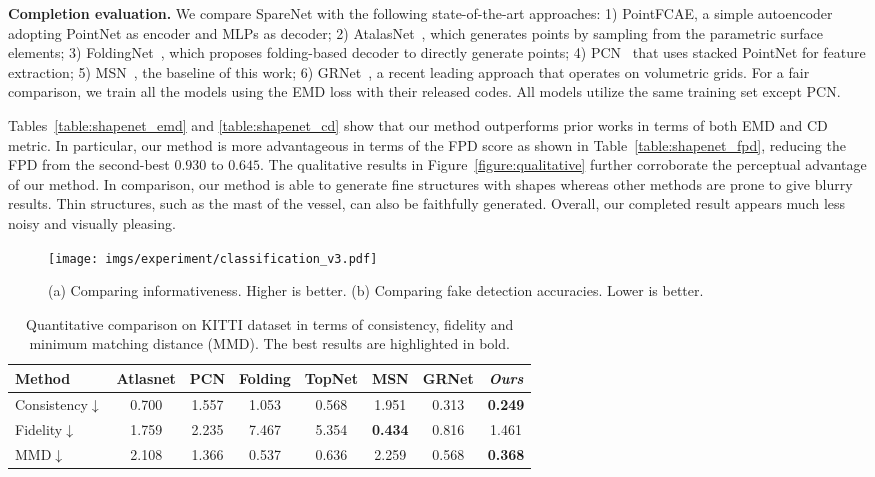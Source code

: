 \documentclass[final]{cvpr}
\begin{document}
\noindent\textbf{Completion evaluation.}
We compare SpareNet with the following state-of-the-art approaches: 1) PointFCAE, a simple autoencoder adopting PointNet as encoder and MLPs as decoder; 2) AtalasNet~\cite{atlasnet2018}, which generates points by sampling from the parametric surface elements; 3) FoldingNet~\cite{foldingnet_2018_CVPR}, which proposes folding-based decoder to directly generate points;  4) PCN~\cite{Yuan-2018-pcn} that uses stacked PointNet for feature extraction; 5) MSN~\cite{liu2019morphing}, the baseline of this work; 6) GRNet~\cite{xie2020grnet}, a recent leading approach that operates on volumetric grids. For a fair comparison, we train all the models using the EMD loss with their released codes. All models utilize the same training set except PCN. 

Tables~\ref{table:shapenet_emd} and \ref{table:shapenet_cd} show that our method outperforms prior works in terms of both EMD and CD metric. In particular, our method is more advantageous in terms of the FPD score as shown in Table~\ref{table:shapenet_fpd}, reducing the FPD from the second-best $0.930$ to $0.645$. The qualitative results in Figure~\ref{figure:qualitative} further corroborate the perceptual advantage of our method. In comparison, our method is able to generate fine structures with shapes whereas other methods are prone to give blurry results. Thin structures, such as the mast of the vessel, can also be faithfully generated. Overall, our completed result appears much less noisy and visually pleasing.


\begin{figure}[t]
\centering
 \texttt{[image: imgs/experiment/classification\_v3.pdf]}
 \footnotesize
\caption{(a) Comparing informativeness. Higher is better. (b) Comparing fake detection accuracies. Lower is better. }
\label{fig:pointnet_classification}
\vspace{-1em}
\end{figure}

\begin{table}
\begin{center}
\footnotesize
\setlength\tabcolsep{3pt}
\begin{tabular}{@{}l|ccccccc@{}}
\toprule
Method&Atlasnet&PCN&Folding&TopNet&MSN&GRNet&\emph{Ours}\\

\midrule
Consistency$\downarrow$ & 0.700 & 1.557 & 1.053 & 0.568 & 1.951 & 0.313 & \textbf{0.249}\\
Fidelity$\downarrow$ & 1.759 & 2.235 & 7.467 & 5.354 & \textbf{0.434} & 0.816 & 1.461\\
MMD$\downarrow$ & 2.108 & 1.366 & 0.537 & 0.636 & 2.259 & 0.568 & \textbf{0.368}\\
\bottomrule
\end{tabular}
\end{center}
\caption{Quantitative comparison on KITTI dataset in terms of consistency, fidelity and minimum matching distance (MMD). The best results are highlighted in bold.
\label{table:kitti}
}
\vspace{-1em}
\end{table}
\end{document}
